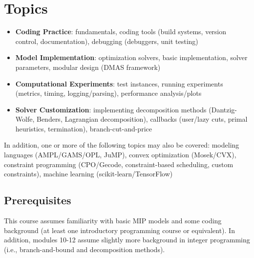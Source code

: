 \documentclass[12pt]{article}
\begin{document}
\section*{Topics}
\begin{itemize}
    \item \textbf{Coding Practice}: fundamentals, coding tools (build systems, version control, documentation), debugging (debuggers, unit testing)
    \item \textbf{Model Implementation}: optimization solvers, basic implementation, solver parameters, modular design (DMAS framework)
    \item \textbf{Computational Experiments}: test instances, running experiments (metrics, timing, logging/parsing), performance analysis/plots
    \item \textbf{Solver Customization}: implementing decomposition methods (Dantzig-Wolfe, Benders, Lagrangian decomposition), callbacks (user/lazy cuts, primal heuristics, termination), branch-cut-and-price
\end{itemize}
In addition, one or more of the following topics may also be covered: modeling languages (AMPL/GAMS/OPL, JuMP), convex optimization (Mosek/CVX), constraint programming (CPO/Gecode, constraint-based scheduling, custom constraints), machine learning (scikit-learn/TensorFlow)
\subsection*{Prerequisites}
This course assumes familiarity with basic MIP models and some coding background (at least one introductory programming course or equivalent). In addition, modules 10-12 assume slightly more background in integer programming (i.e., branch-and-bound and decomposition methods).
\end{document}
